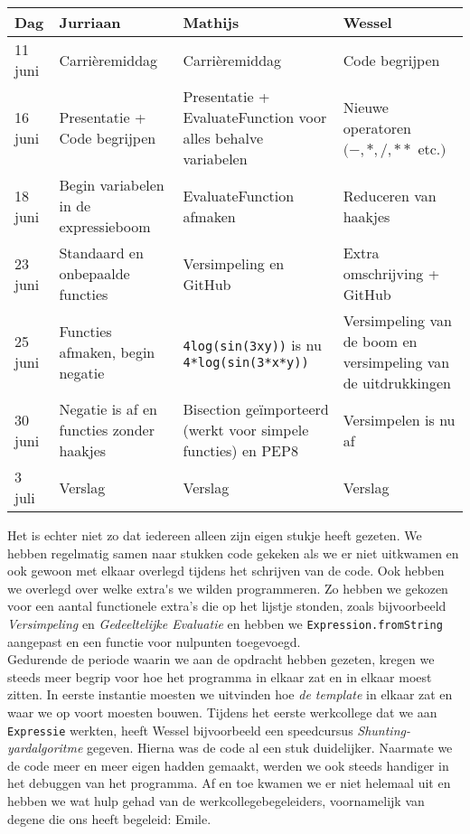 \documentclass[12pt]{article}
\begin{document}
\begin{center}
    \begin{tabular}{ | l | p{4cm}  | p{4cm} | p{4cm} |}
    \hline
    Dag & Jurriaan & Mathijs & Wessel \\ \hline
    11 juni & Carri\`eremiddag & Carri\`eremiddag & Code begrijpen \\ \hline
    16 juni & Presentatie + Code begrijpen & Presentatie + EvaluateFunction voor alles behalve variabelen & Nieuwe operatoren  $(-, *, /, **$ etc.$)$ \\ \hline
    18 juni & Begin variabelen in de expressieboom & EvaluateFunction afmaken & Reduceren van haakjes \\ \hline
    23 juni & Standaard en onbepaalde functies & Versimpeling en GitHub & Extra omschrijving + GitHub \\ \hline
    25 juni & Functies afmaken, begin negatie & \texttt{4log(sin(3xy))} is nu \texttt{4*log(sin(3*x*y))} & Versimpeling van de boom en versimpeling van de uitdrukkingen \\ \hline
    30 juni & Negatie is af en functies zonder haakjes & Bisection ge\"{i}mporteerd (werkt voor simpele functies) en PEP8 & Versimpelen is nu af \\ \hline
    3 juli & Verslag & Verslag & Verslag \\
    \hline
    \end{tabular}
\end{center}
Het is echter niet zo dat iedereen alleen zijn eigen stukje heeft gezeten. We hebben regelmatig samen naar stukken code gekeken als we er niet uitkwamen en ook gewoon met elkaar overlegd tijdens het schrijven van de code. Ook hebben we overlegd over welke extra\'{}s we wilden programmeren. Zo hebben we gekozen voor een aantal functionele extra's{} die op het lijstje stonden, zoals bijvoorbeeld \textit{Versimpeling} en \textit{Gedeeltelijke Evaluatie} en hebben we \texttt{Expression.fromString} aangepast en een functie voor nulpunten toegevoegd. \\ \newline
Gedurende de periode waarin we aan de opdracht hebben gezeten, kregen we steeds meer begrip voor hoe het programma in elkaar zat en in elkaar moest zitten. In eerste instantie moesten we uitvinden hoe \textit{de template} in elkaar zat en waar we op voort moesten bouwen. Tijdens het eerste werkcollege dat we aan \texttt{Expressie} werkten, heeft Wessel bijvoorbeeld een speedcursus \textit{Shunting-yardalgoritme} gegeven. Hierna was de code al een stuk duidelijker. Naarmate we de code meer en meer eigen hadden gemaakt, werden we ook steeds handiger in het debuggen van het programma. Af en toe kwamen we er niet helemaal uit en hebben we wat hulp gehad van de werkcollegebegeleiders, voornamelijk van degene die ons heeft begeleid: Emile. \\ \newline
\end{document}
